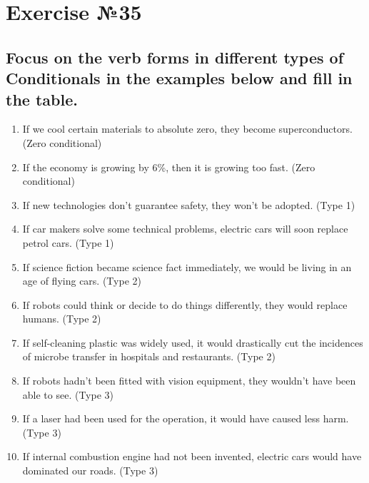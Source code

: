 \section{Exercise №35}
\subsection*{Focus on the verb forms in different types of Conditionals in the examples below and fill
      in the table.}
\begin{enumerate}
      \item If we cool certain materials to absolute zero, they become superconductors. (Zero conditional)
      \item If the economy is growing by 6\%, then it is growing too fast. (Zero conditional)
      \item If new technologies don’t guarantee safety, they won’t be adopted. (Type 1)
      \item If car makers solve some technical problems, electric cars will soon replace petrol cars. (Type 1)
      \item If science fiction became science fact immediately, we would be living in an age of flying cars. (Type 2)
      \item If robots could think or decide to do things differently, they would replace humans. (Type 2)
      \item If self-cleaning plastic was widely used, it would drastically cut the incidences of microbe transfer in hospitals and restaurants. (Type 2)
      \item If robots hadn’t been fitted with vision equipment, they wouldn’t have been able to see. (Type 3)
      \item If a laser had been used for the operation, it would have caused less harm. (Type 3)
      \item If internal combustion engine had not been invented, electric cars would have dominated our roads. (Type 3)
\end{enumerate}

